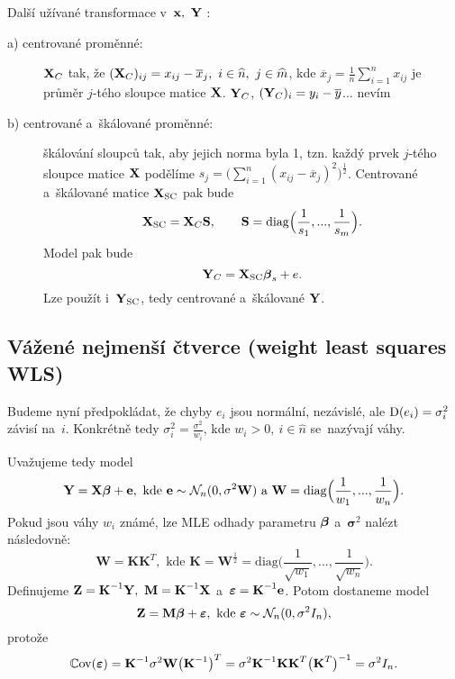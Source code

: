 \begin{remark}
	Další užívané transformace v~$\textbf{x},~\textbf{Y}$ :\begin{description}
	\item[a) centrované proměnné:] $\textbf{X}_C$ tak, že $(\textbf{X}_C)_{ij} = x_{ij}-\overline{x}_j,~i\in\widehat{n},~j\in\widehat{m}$, kde $\overline{x}_j = \frac{1}{n}\sum_{i = 1}^n x_{ij}$ je průměr $j$-tého sloupce matice $\textbf{X}$. $\textbf{Y}_C$, $(\textbf{Y}_C)_i = y_i-\overline{y}$... nevím
	\item[b) centrované a~škálované proměnné:] škálování sloupců tak, aby jejich norma byla 1, tzn. každý prvek $j$-tého sloupce matice $\textbf{X}$ podělíme $s_j = \Big(\sum_{i = 1}^n (x_{ij}-\overline{x}_j)^2\Big)^{\frac{1}{2}}$. Centrované a~škálované matice $\textbf{X}_\mathrm{SC}$ pak bude
	 $$
	\textbf{X}_\mathrm{SC} = \textbf{X}_C\textbf{S},\qquad \textbf{S} = \mathrm{diag}\Big(\frac{1}{s_1},...,\frac{1}{s_m}\Big).
	 $$
	Model pak bude
	 $$
	\textbf{Y}_C = \textbf{X}_\mathrm{SC}\boldsymbol{\beta}_s+e. $$ Lze použít i~$\textbf{Y}_\mathrm{SC}$, tedy centrované a~škálované $\textbf{Y}$.
	\end{description}
\end{remark}

\subsection*{Vážené nejmenší čtverce (weight least squares WLS)}
Budeme nyní předpokládat, že chyby $e_i$ jsou normální, nezávislé, ale $\mathrm{D}(e_i) = \sigma_i^2$ závisí na~$i$. Konkrétně tedy $\sigma_i^2 = \frac{\sigma^2}{w_i}$, kde $w_i>0,~i\in\widehat{n}$ se~nazývají váhy.

Uvažujeme tedy model
\begin{equation}\label{rovnickaW}
\textbf{Y} = \textbf{X}\boldsymbol{\beta}+\textbf{e},\text{ kde }\textbf{e}\sim\mathcal{N}_n(0,\sigma^2\textbf{W})\text{ a~}\textbf{W} = \mathrm{diag}\Big(\frac{1}{w_1},...,\frac{1}{w_n}\Big).
\end{equation}
Pokud jsou váhy $w_i$ známé, lze MLE odhady parametru $\boldsymbol{\beta}$ a~$\boldsymbol{\sigma}^2$ nalézt následovně:
 $$
\textbf{W} = \textbf{K} \textbf{K}^T,\text{ kde }\textbf{K} = \textbf{W}^{\frac{1}{2}} = \mathrm{diag}\Big(\frac{1}{\sqrt{w_1}},...,\frac{1}{\sqrt{w_n}}\Big).
 $$
Definujeme $\textbf{Z} = {\textbf{K}^{-1}}\textbf{Y},~\textbf{M} = {\textbf{K}^{-1}}\textbf{X}$ a~$\boldsymbol{\varepsilon} = {\textbf{K}^{-1}}\textbf{e}$. Potom dostaneme model
\begin{equation}\label{rovnickaW2}
\textbf{Z} = \textbf{M}\boldsymbol{\beta}+\boldsymbol{\varepsilon},\text{ kde }\boldsymbol{\varepsilon}\sim\mathcal{N}_n(0,\sigma^2 I_n),
\end{equation}
protože
 $$
\mathbb{C}\mathrm{ov}(\boldsymbol{\varepsilon}) = {\textbf{K}^{-1}}\sigma^2\textbf{W}\big({\textbf{K}^{-1}}\big)^T = \sigma^2 {\textbf{K}^{-1}}\textbf{K}\textbf{K}^T\big(\textbf{K}^T\big)^{-1} = \sigma^2 I_n.
 $$

